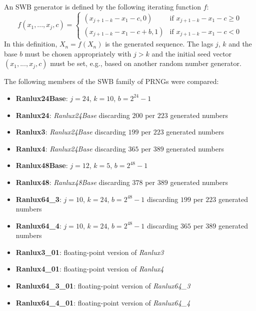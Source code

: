     An SWB generator is defined by the following iterating function $f$:
    \begin{equation*}
        f\left(x_1, ..., x_j, c\right) = \begin{cases}
                                             \left(x_{j + 1 - k} - x_1 - c, 0\right)     & \text{if } x_{j + 1 - k} - x_1 - c \geq 0 \\
                                             \left(x_{j + 1 - k} - x_1 - c + b, 1\right) & \text{if } x_{j + 1 - k} - x_1 - c < 0
                                         \end{cases}
    \end{equation*}
    In this definition, $X_n = f\left(X_n\right)$ is the generated sequence. The lags $j$, $k$ and the base $b$ must be chosen appropriately with $j > k$ and the initial seed vector $\left(x_1, ..., x_j, c\right)$ must be set, e.g., based on another random number generator.

    The following members of the SWB family of PRNGs were compared:
    \begin{itemize}
        \itemsep0em
        \item \textbf{Ranlux24Base}:    $j = 24$, $k = 10$, $b = 2^{24} - 1$
        \item \textbf{Ranlux24}:        \textit{Ranlux24Base} discarding $200$ per $223$ generated numbers
        \item \textbf{Ranlux3}:         \textit{Ranlux24Base} discarding $199$ per $223$ generated numbers
        \item \textbf{Ranlux4}:         \textit{Ranlux24Base} discarding $365$ per $389$ generated numbers
        \item \textbf{Ranlux48Base}:    $j = 12$, $k = 5$, $b = 2^{48} - 1$
        \item \textbf{Ranlux48}:        \textit{Ranlux48Base} discarding $378$ per $389$ generated numbers
        \item \textbf{Ranlux64\_3}:     $j = 10$, $k = 24$, $b = 2^{48} - 1$ discarding $199$ per $223$ generated numbers
        \item \textbf{Ranlux64\_4}:     $j = 10$, $k = 24$, $b = 2^{48} - 1$ discarding $365$ per $389$ generated numbers
        \item \textbf{Ranlux3\_01}:     floating-point version of \textit{Ranlux3}
        \item \textbf{Ranlux4\_01}:     floating-point version of \textit{Ranlux4}
        \item \textbf{Ranlux64\_3\_01}: floating-point version of \textit{Ranlux64\_3}
        \item \textbf{Ranlux64\_4\_01}: floating-point version of \textit{Ranlux64\_4}
    \end{itemize}

